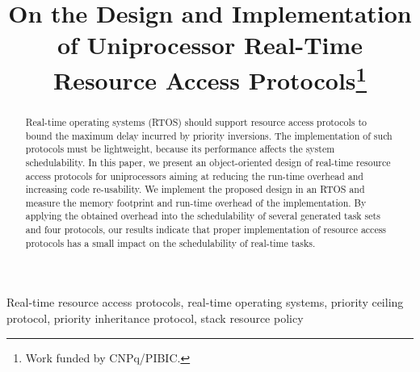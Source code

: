 \documentclass[10pt, conference]{IEEEtran}
\begin{document}
%
\title{On the Design and 
Implementation of Uniprocessor
Real-Time Resource Access 
Protocols\thanks{Work 
funded by CNPq/PIBIC.}}

\author{
\and
{}}

\maketitle
\thispagestyle{plain}
\pagestyle{plain}

\begin{abstract}
Real-time operating systems (RTOS) should support resource access protocols 
to bound the maximum delay incurred by priority inversions. The implementation 
of such protocols must be lightweight, because its performance affects the 
system schedulability. In this paper, we present an object-oriented design of 
real-time resource access protocols for uniprocessors aiming at reducing the 
run-time overhead and increasing code re-usability. We implement the proposed 
design in an RTOS and measure the memory footprint and run-time overhead of the 
implementation. By applying the obtained overhead into the 
schedulability of several generated task sets and four protocols, our results 
indicate that proper implementation of resource access protocols has a small 
impact on the schedulability of real-time tasks.
\end{abstract}

\begin{IEEEkeywords}
Real-time resource access protocols, real-time operating systems, 
priority ceiling protocol, priority inheritance protocol, stack resource 
policy
\end{IEEEkeywords}

\IEEEpeerreviewmaketitle












\end{document}
